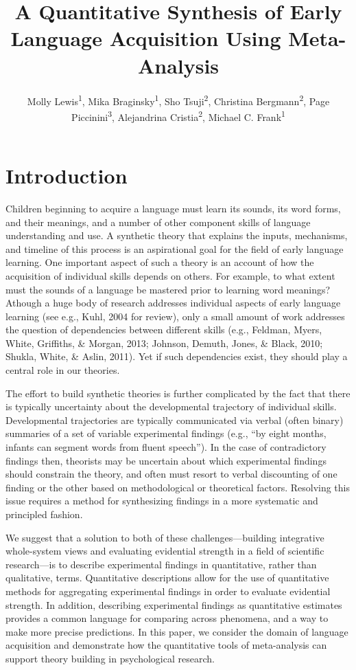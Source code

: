 \documentclass[english,floatsintext,man]{apa6}
\title{A Quantitative Synthesis of Early Language Acquisition Using
Meta-Analysis}
\author{
          Molly Lewis\textsuperscript{1},
          Mika Braginsky\textsuperscript{1},
          Sho Tsuji\textsuperscript{2},
          Christina Bergmann\textsuperscript{2},
          Page Piccinini\textsuperscript{3},
          Alejandrina Cristia\textsuperscript{2},
          Michael C. Frank\textsuperscript{1}  }
\affiliation{
    \vspace{0.5cm}
          \textsuperscript{1} Department of Psychology, Stanford University\\
          \textsuperscript{2} Laboratoire de Sciences Cognitives et Psycholinguistique, ENS\\
          \textsuperscript{3} NeuroPsychologie Interventionnelle (NPI), ENS  }
\begin{document}
\maketitle



\section{Introduction}\label{introduction}

Children beginning to acquire a language must learn its sounds, its word
forms, and their meanings, and a number of other component skills of
language understanding and use. A synthetic theory that explains the
inputs, mechanisms, and timeline of this process is an aspirational goal
for the field of early language learning. One important aspect of such a
theory is an account of how the acquisition of individual skills depends
on others. For example, to what extent must the sounds of a language be
mastered prior to learning word meanings? Athough a huge body of
research addresses individual aspects of early language learning (see
e.g., Kuhl, 2004 for review), only a small amount of work addresses the
question of dependencies between different skills (e.g., Feldman, Myers,
White, Griffiths, \& Morgan, 2013; Johnson, Demuth, Jones, \& Black,
2010; Shukla, White, \& Aslin, 2011). Yet if such dependencies exist,
they should play a central role in our theories.

The effort to build synthetic theories is further complicated by the
fact that there is typically uncertainty about the developmental
trajectory of individual skills. Developmental trajectories are
typically communicated via verbal (often binary) summaries of a set of
variable experimental findings (e.g., \enquote{by eight months, infants
can segment words from fluent speech}). In the case of contradictory
findings then, theorists may be uncertain about which experimental
findings should constrain the theory, and often must resort to verbal
discounting of one finding or the other based on methodological or
theoretical factors. Resolving this issue requires a method for
synthesizing findings in a more systematic and principled fashion.

We suggest that a solution to both of these challenges---building
integrative whole-system views and evaluating evidential strength in a
field of scientific research---is to describe experimental findings in
quantitative, rather than qualitative, terms. Quantitative descriptions
allow for the use of quantitative methods for aggregating experimental
findings in order to evaluate evidential strength. In addition,
describing experimental findings as quantitative estimates provides a
common language for comparing across phenomena, and a way to make more
precise predictions. In this paper, we consider the domain of language
acquisition and demonstrate how the quantitative tools of meta-analysis
can support theory building in psychological research.
\end{document}
